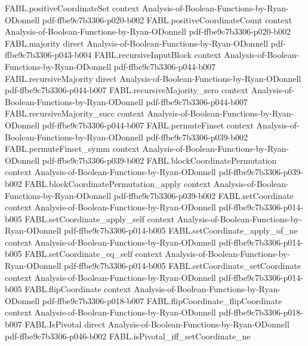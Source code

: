 \begin{theorem}
\proofstep
  {FABL.positiveCoordinateSet}
  {context}
  {Analysis-of-Boolean-Functions-by-Ryan-ODonnell}
  {pdf-ffbe9c7b3306-p020-b002}
\proofstep
  {FABL.positiveCoordinateCount}
  {context}
  {Analysis-of-Boolean-Functions-by-Ryan-ODonnell}
  {pdf-ffbe9c7b3306-p020-b002}
\proofstep
  {FABL.majority}
  {direct}
  {Analysis-of-Boolean-Functions-by-Ryan-ODonnell}
  {pdf-ffbe9c7b3306-p043-b004}
\proofstep
  {FABL.recursiveInputBlock}
  {context}
  {Analysis-of-Boolean-Functions-by-Ryan-ODonnell}
  {pdf-ffbe9c7b3306-p044-b007}
\proofstep
  {FABL.recursiveMajority}
  {direct}
  {Analysis-of-Boolean-Functions-by-Ryan-ODonnell}
  {pdf-ffbe9c7b3306-p044-b007}
\proofstep
  {FABL.recursiveMajority_zero}
  {context}
  {Analysis-of-Boolean-Functions-by-Ryan-ODonnell}
  {pdf-ffbe9c7b3306-p044-b007}
\proofstep
  {FABL.recursiveMajority_succ}
  {context}
  {Analysis-of-Boolean-Functions-by-Ryan-ODonnell}
  {pdf-ffbe9c7b3306-p044-b007}
\proofstep
  {FABL.permuteFinset}
  {context}
  {Analysis-of-Boolean-Functions-by-Ryan-ODonnell}
  {pdf-ffbe9c7b3306-p039-b002}
\proofstep
  {FABL.permuteFinset_symm}
  {context}
  {Analysis-of-Boolean-Functions-by-Ryan-ODonnell}
  {pdf-ffbe9c7b3306-p039-b002}
\proofstep
  {FABL.blockCoordinatePermutation}
  {context}
  {Analysis-of-Boolean-Functions-by-Ryan-ODonnell}
  {pdf-ffbe9c7b3306-p039-b002}
\proofstep
  {FABL.blockCoordinatePermutation_apply}
  {context}
  {Analysis-of-Boolean-Functions-by-Ryan-ODonnell}
  {pdf-ffbe9c7b3306-p039-b002}
\proofstep
  {FABL.setCoordinate}
  {context}
  {Analysis-of-Boolean-Functions-by-Ryan-ODonnell}
  {pdf-ffbe9c7b3306-p014-b005}
\proofstep
  {FABL.setCoordinate_apply_self}
  {context}
  {Analysis-of-Boolean-Functions-by-Ryan-ODonnell}
  {pdf-ffbe9c7b3306-p014-b005}
\proofstep
  {FABL.setCoordinate_apply_of_ne}
  {context}
  {Analysis-of-Boolean-Functions-by-Ryan-ODonnell}
  {pdf-ffbe9c7b3306-p014-b005}
\proofstep
  {FABL.setCoordinate_eq_self}
  {context}
  {Analysis-of-Boolean-Functions-by-Ryan-ODonnell}
  {pdf-ffbe9c7b3306-p014-b005}
\proofstep
  {FABL.setCoordinate_setCoordinate}
  {context}
  {Analysis-of-Boolean-Functions-by-Ryan-ODonnell}
  {pdf-ffbe9c7b3306-p014-b005}
\proofstep
  {FABL.flipCoordinate}
  {context}
  {Analysis-of-Boolean-Functions-by-Ryan-ODonnell}
  {pdf-ffbe9c7b3306-p018-b007}
\proofstep
  {FABL.flipCoordinate_flipCoordinate}
  {context}
  {Analysis-of-Boolean-Functions-by-Ryan-ODonnell}
  {pdf-ffbe9c7b3306-p018-b007}
\proofstep
  {FABL.IsPivotal}
  {direct}
  {Analysis-of-Boolean-Functions-by-Ryan-ODonnell}
  {pdf-ffbe9c7b3306-p046-b002}
\proofstep
  {FABL.isPivotal_iff_setCoordinate_ne}

\end{theorem}
